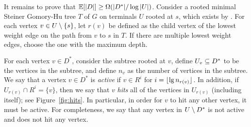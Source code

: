 It remains to prove that $\mathbb E[|D|]\ge\Omega(|D^*|/\log|U|)$. 
Consider a rooted minimal Steiner Gomory-Hu tree $T$ of $G$ on terminals $U$ rooted at $s$, which exists by . For each vertex $v\in U\setminus \{s\}$, let $r(v)$ be defined as the child vertex of the lowest weight edge on the path from $v$ to $s$ in $T$. If there are multiple lowest weight edges, choose the one with the maximum depth. %


For each vertex $v\in D^*$, consider the subtree rooted at $v$, define $U_v\subseteq D^*$ to be the vertices in the subtree, and define $n_v$ as the number of vertices in the subtree. We say that a vertex $v\in D^*$ is \emph{active} if $v\in R^i$ for $i=\lfloor\lg n_{r(v)}\rfloor$. In addition, if $U_{r(v)}\cap R^i=\{v\}$, then we say that $v$ \emph{hits} all of the vertices in $U_{r(v)}$ (including itself); see Figure~\ref{fig:hits}. In particular, in order for $v$ to hit any other vertex, it must be active. For completeness, we say that any vertex in $U\setminus D^*$ is not active and does not hit any vertex.



